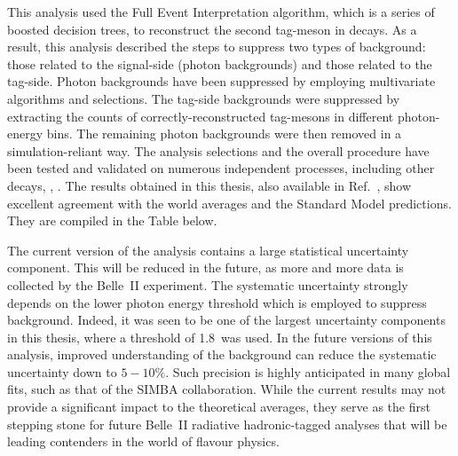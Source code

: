 This \BtoXsgamma analysis used the Full Event Interpretation algorithm, which is a series of boosted decision trees, to reconstruct the second tag-\B meson in \FourS decays.
As a result, this analysis described the steps to suppress two types of background: those related to the signal-side (photon backgrounds) and those related to the tag-side.
Photon backgrounds have been suppressed by employing multivariate algorithms and selections.
The tag-side backgrounds were suppressed by extracting the counts of correctly-reconstructed tag-\B mesons in different photon-energy bins.
The remaining photon backgrounds were then removed in a simulation-reliant way.
The analysis selections and the overall procedure have been tested and validated on numerous independent processes, including other \B decays, \mbox{\epem\ra\qqbar}, \mbox{\epem\ra\mumu}.
The results obtained in this thesis, also available in Ref.~\cite{Belle-II:2022hys}, show excellent agreement with the world averages and the Standard Model predictions.
They are compiled in the Table below.
\begin{table}[hbtp!]
\end{table}

The current version of the analysis contains a large statistical uncertainty component. 
This will be reduced in the future, as more and more data is collected by the Belle~II experiment.
The systematic uncertainty strongly depends on the lower photon energy threshold which is employed to suppress background.
Indeed, it was seen to be one of the largest uncertainty components in this thesis, where a threshold of 1.8~\gev was used.
In the future versions of this analysis, improved understanding of the background can reduce the systematic uncertainty down to $5-10\%$.
Such precision is highly anticipated in many global fits, such as that of the SIMBA collaboration.
While the current results may not provide a significant impact to the theoretical averages, they serve as the first stepping stone for future Belle~II radiative hadronic-tagged analyses that will be leading contenders in the world of flavour physics.






